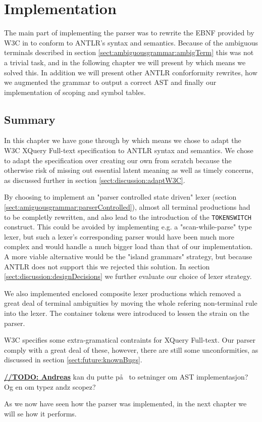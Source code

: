 \chapter{Implementation}


The main part of implementing the parser was to rewrite the EBNF provided by W3C in \cite{w3c01} to conform to ANTLR's syntax and semantics. Because of the ambiguous terminals described in section \ref{sect:ambiguousgrammar:ambigTerm} this was not a trivial task, and in the following chapter we will present by which means we solved this. In addition we will present other ANTLR conforformity rewrites, how we augmented the grammar to output a correct AST and finally our implementation of scoping and symbol tables.









\section{Summary}
In this chapter we have gone through by which means we chose to adapt the W3C XQuery Full-text specification to ANTLR syntax and semantics. We chose to adapt the specification over creating our own from scratch because the otherwise risk of missing out essential latent meaning as well as timely concerns, as discussed further in section \ref{sect:discussion:adaptW3C}.

By choosing to implement an "parser controlled state driven" lexer (section \ref{sect:amiguousgrammar:parserControlled}), almost all terminal productions had to be completly rewritten, and also lead to the introduction of the \verb!TOKENSWITCH! construct. This could be avoided by implementing e.g. a "scan-while-parse" type lexer, but such a lexer's corresponding parser would have been much more complex and would handle a much bigger load than that of our implementation. A more viable alternative would be the "island grammars" strategy, but because ANTLR does not support this we rejected this solution. In section \ref{sect:discussion:designDecisions} we further evaluate our choice of lexer strategy.

We also implemented enclosed composite lexer productions which removed a great deal of terminal ambiguities by moving the whole refering non-terminal rule into the lexer. The container tokens were introduced to lessen the strain on the parser.

W3C specifies some extra-gramatical contraints for XQuery Full-text. Our parser comply with a great deal of these, however, there are still some unconformities, as discussed in section \ref{sect:future:knownBugs}.

\underline{\textbf{\LARGE //TODO: Andreas}} kan du putte p\aa~ to setninger om AST implementasjon? Og en om typez andz scopez?

As we now have seen how the parser was implemented, in the next chapter we will se how it performs.